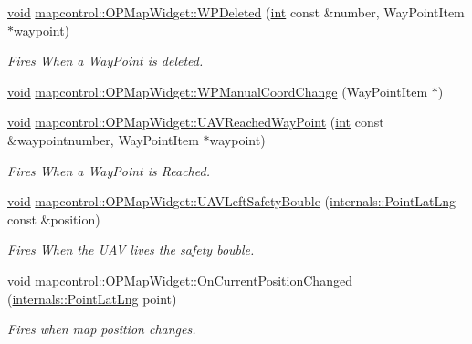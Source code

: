 \begin{DoxyCompactItemize}
\hyperlink{group___u_a_v_objects_plugin_ga444cf2ff3f0ecbe028adce838d373f5c}{void} \hyperlink{group___o_p_map_widget_ga27de44a330cf3ee63827db0c562f7bb8}{mapcontrol\-::\-O\-P\-Map\-Widget\-::\-W\-P\-Deleted} (\hyperlink{ioapi_8h_a787fa3cf048117ba7123753c1e74fcd6}{int} const \&number, Way\-Point\-Item $\ast$waypoint)
\begin{DoxyCompactList}\small\item\em Fires When a Way\-Point is deleted. \end{DoxyCompactList}\item 
\hyperlink{group___u_a_v_objects_plugin_ga444cf2ff3f0ecbe028adce838d373f5c}{void} \hyperlink{group___o_p_map_widget_gac6d662e318e008a70747a8d26b971a3a}{mapcontrol\-::\-O\-P\-Map\-Widget\-::\-W\-P\-Manual\-Coord\-Change} (Way\-Point\-Item $\ast$)
\item 
\hyperlink{group___u_a_v_objects_plugin_ga444cf2ff3f0ecbe028adce838d373f5c}{void} \hyperlink{group___o_p_map_widget_ga532ae30a356e865120c460f345a4ab65}{mapcontrol\-::\-O\-P\-Map\-Widget\-::\-U\-A\-V\-Reached\-Way\-Point} (\hyperlink{ioapi_8h_a787fa3cf048117ba7123753c1e74fcd6}{int} const \&waypointnumber, Way\-Point\-Item $\ast$waypoint)
\begin{DoxyCompactList}\small\item\em Fires When a Way\-Point is Reached. \end{DoxyCompactList}\item 
\hyperlink{group___u_a_v_objects_plugin_ga444cf2ff3f0ecbe028adce838d373f5c}{void} \hyperlink{group___o_p_map_widget_ga77cc2b980ecb442b256f8f494a8835c7}{mapcontrol\-::\-O\-P\-Map\-Widget\-::\-U\-A\-V\-Left\-Safety\-Bouble} (\hyperlink{structinternals_1_1_point_lat_lng}{internals\-::\-Point\-Lat\-Lng} const \&position)
\begin{DoxyCompactList}\small\item\em Fires When the U\-A\-V lives the safety bouble. \end{DoxyCompactList}\item 
\hyperlink{group___u_a_v_objects_plugin_ga444cf2ff3f0ecbe028adce838d373f5c}{void} \hyperlink{group___o_p_map_widget_ga15064d97d2715398719dd78fccb07a39}{mapcontrol\-::\-O\-P\-Map\-Widget\-::\-On\-Current\-Position\-Changed} (\hyperlink{structinternals_1_1_point_lat_lng}{internals\-::\-Point\-Lat\-Lng} point)
\begin{DoxyCompactList}\small\item\em Fires when map position changes. \end{DoxyCompactList}\item 

\end{DoxyCompactItemize}
